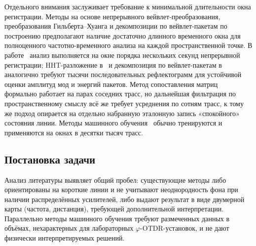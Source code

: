 \documentclass[12pt,a4paper]{extarticle}
\newcommand{\phiOTDR}{$\varphi$-OTDR}
\begin{document}
Отдельного внимания заслуживает требование к минимальной длительности окна регистрации. Методы на основе непрерывного вейвлет-преобразования, преобразования Гильберта–Хуанга и декомпозиции по вейвлет-пакетам по построению предполагают наличие достаточно длинного временного окна для полноценного частотно-временного анализа на каждой пространственной точке. В работе~\cite{Qin2012} анализ выполняется на окне порядка нескольких секунд непрерывной регистрации; HHT-разложение в~\cite{Hui2014} и декомпозиция по вейвлет-пакетам в~\cite{Li2014} аналогично требуют тысячи последовательных рефлектограмм для устойчивой оценки амплитуд мод и энергий пакетов. Метод сопоставления матриц~\cite{Liu2018} формально работает на парах соседних трасс, но дальнейшая фильтрация по пространственному смыслу всё же требует усреднения по сотням трасс, к тому же подход опирается на отдельно набранную эталонную запись «спокойного» состояния линии. Методы машинного обучения~\cite{Wu2019, Shi2020} обычно тренируются и применяются на окнах в десятки тысяч трасс.

\subsection{Постановка задачи}
\label{sec:problem}

Анализ литературы выявляет общий пробел: существующие методы либо ориентированы на короткие линии и не учитывают неоднородность фона при наличии распределённых усилителей, либо выдают результат в виде двумерной карты (частота, дистанция), требующей дополнительной интерпретации. Параллельно методы машинного обучения требуют размеченных данных в объёмах, нехарактерных для лабораторных \phiOTDR-установок, и не дают физически интерпретируемых решений.
\end{document}

